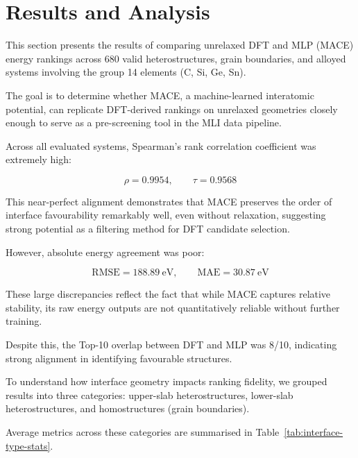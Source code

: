 \section{Results and Analysis} \label{section:results_and_analysis}


This section presents the results of comparing unrelaxed DFT and MLP (MACE) energy rankings across 680 valid
heterostructures, grain boundaries, and alloyed systems involving the group 14 elements (C, Si, Ge, Sn).

The goal is to determine whether MACE, a machine-learned interatomic potential, can replicate DFT-derived rankings on
unrelaxed geometries closely enough to serve as a pre-screening tool in the MLI data pipeline.


Across all evaluated systems, Spearman's rank correlation coefficient was extremely high:


\[
\rho = 0.9954, \qquad \tau = 0.9568
\]


This near-perfect alignment demonstrates that MACE preserves the order of interface favourability remarkably well, even
without relaxation, suggesting strong potential as a filtering method for DFT candidate selection.


However, absolute energy agreement was poor:


\[
\text{RMSE} = 188.89~\text{eV}, \qquad \text{MAE} = 30.87~\text{eV}
\]


These large discrepancies reflect the fact that while MACE captures relative stability, its raw energy outputs are not
quantitatively reliable without further training.

Despite this, the Top-10 overlap between DFT and MLP was 8/10, indicating strong alignment in identifying favourable
structures.


To understand how interface geometry impacts ranking fidelity, we grouped results into three categories: upper-slab
heterostructures, lower-slab heterostructures, and homostructures (grain boundaries).

Average metrics across these categories are summarised in Table~\ref{tab:interface-type-stats}.


